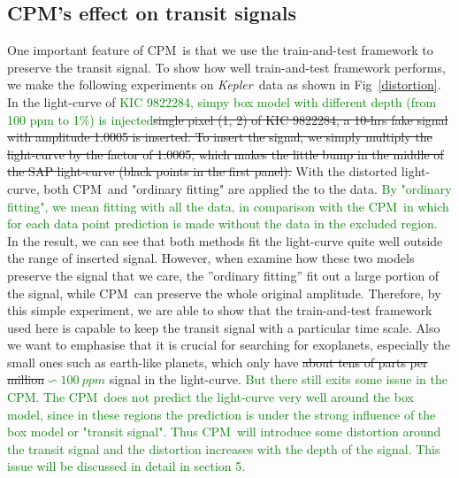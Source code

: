 \documentclass[12pt, preprint]{aastex}
\newcommand{\project}[1]{\textsl{#1}}
\newcommand{\Kepler}{\project{Kepler}}
\newcommand{\name}{CPM}
\newcommand{\revise}[1]{\textcolor{green}{#1}}
\newcommand{\remove}[1]{\sout{#1}}
\begin{document}
\subsection{\name's effect on transit signals}
One important feature of \name\ is that we use the train-and-test framework to preserve 
the transit signal. To show how well train-and-test framework performs, we make the
following experiments on \Kepler\ data as shown in Fig~\ref{distortion}.
In the light-curve of \revise{KIC 9822284, simpy box model with different depth (from 100 ppm to 1\%) is injected}\remove{single pixel (1, 2) of KIC 9822284, a 10-hrs fake signal 
with amplitude 1.0005 is inserted. To insert the signal, we simply multiply the light-curve 
by the factor of 1.0005, which makes the little bump in the middle of the SAP light-curve 
(black points in the first panel).} With the distorted light-curve, both \name\ and "ordinary fitting" are applied the to the data. 
\revise{By "ordinary fitting", we mean fitting with all the data,  in comparison with the \name\, in which for each data point prediction is made without the data in the excluded region.}  
In the result, we can see that both methods fit the light-curve quite well outside the range of inserted signal. 
However, when examine how these two models preserve the signal that we care, the ''ordinary fitting'' fit out a large portion of the signal, while \name\ can preserve the whole 
original amplitude. Therefore,  by this simple experiment, we are able to show that the train-and-test framework used here is capable to keep the transit signal with a particular time scale. 
Also we want to emphasise that it is crucial for searching for
exoplanets, especially the small ones such as earth-like planets, which only have \remove{about tens of parts per million}\revise{$\backsim 100\ ppm$} signal in the light-curve. \revise{But there still exits some issue in the \name. 
The \name\ does not predict the light-curve very well around the box model, since in these regions the prediction is under the strong influence of the box model or "transit signal". 
Thus \name\ will introduce some distortion around the transit signal and the distortion increases with the depth of the signal. This issue will be discussed in detail in section 5.}
\end{document}
